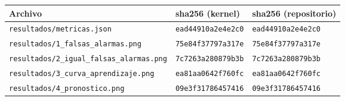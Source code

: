 \begin{tabular}{lll}\toprule
 Archivo & sha256 (kernel) & sha256 (repositorio) \\
\midrule
\texttt{resultados/metricas.json} & \texttt{ead44910a2e4e2c0} & \texttt{ead44910a2e4e2c0} \\
\texttt{resultados/1\_falsas\_alarmas.png} & \texttt{75e84f37797a317e} & \texttt{75e84f37797a317e} \\
\texttt{resultados/2\_igual\_falsas\_alarmas.png} & \texttt{7c7263a280879b3b} & \texttt{7c7263a280879b3b} \\
\texttt{resultados/3\_curva\_aprendizaje.png} & \texttt{ea81aa0642f760fc} & \texttt{ea81aa0642f760fc} \\
\texttt{resultados/4\_pronostico.png} & \texttt{09e3f31786457416} & \texttt{09e3f31786457416} \\
\bottomrule\end{tabular}
